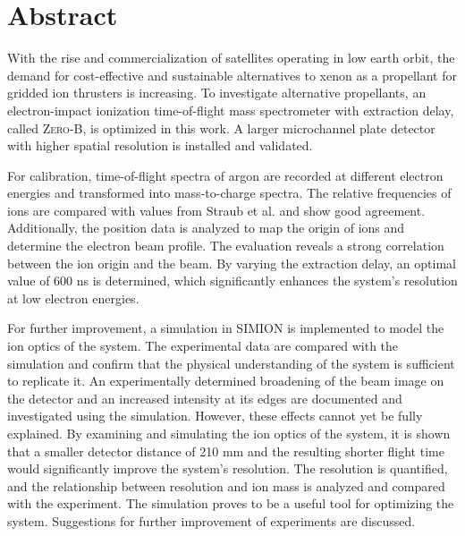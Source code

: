 \chapter*{Abstract}
With the rise and commercialization of satellites operating in low earth orbit, the demand for cost-effective and sustainable alternatives to xenon as a propellant for gridded ion thrusters is increasing. To investigate alternative propellants, an electron-impact ionization time-of-flight mass spectrometer with extraction delay, called \textsc{Zero-B}, is optimized in this work. A larger microchannel plate detector with higher spatial resolution is installed and validated.

For calibration, time-of-flight spectra of argon are recorded at different electron energies and transformed into mass-to-charge spectra. The relative frequencies of ions are compared with values from Straub et al. \cite{Straub} and show good agreement. Additionally, the position data is analyzed to map the origin of ions and determine the electron beam profile. The evaluation reveals a strong correlation between the ion origin and the beam. By varying the extraction delay, an optimal value of 600 ns is determined, which significantly enhances the system’s resolution at low electron energies.

For further improvement, a simulation in \textsc{SIMION} is implemented to model the ion optics of the system. The experimental data are compared with the simulation and confirm that the physical understanding of the system is sufficient to replicate it. An experimentally determined broadening of the beam image on the detector and an increased intensity at its edges are documented and investigated using the simulation. However, these effects cannot yet be fully explained. By examining and simulating the ion optics of the system, it is shown that a smaller detector distance of 210 mm and the resulting shorter flight time would significantly improve the system’s resolution. The resolution is quantified, and the relationship between resolution and ion mass is analyzed and compared with the experiment. The simulation proves to be a useful tool for optimizing the system. Suggestions for further improvement of experiments are discussed.